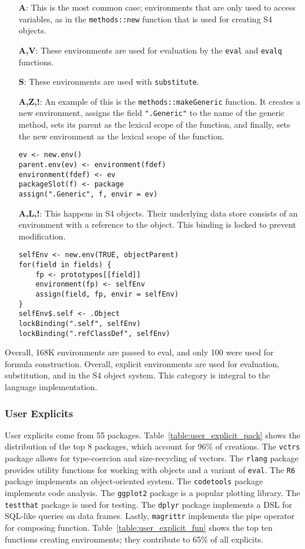 \documentclass[10pt,sigplan,authorversion=true]{acmart}
\renewcommand{\c}[1]{\lstinline |#1|\xspace}
\begin{document}
\begin{itemize}
\item[{\bf A}:] This is the most common case; environments that are only used to
  access variables, as in the \c{methods::new} function that is used for
  creating S4 objects.
\item[{\bf A,V}:] These environments are used for evaluation by the \c{eval} and
  \c{evalq} functions.
\item[{\bf S}:] These environments are used with \c{substitute}.
\item[{\bf A,Z,!}:] An example of this is the \c{methods::makeGeneric} function.
  It creates a new environment, assigns the field \c{".Generic"} to the name of
  the generic method, sets its parent as the lexical scope of the function, and
  finally, sets the new environment as the lexical scope of the function.
\begin{lstlisting}
ev <- new.env()
parent.env(ev) <- environment(fdef)
environment(fdef) <- ev
packageSlot(f) <- package
assign(".Generic", f, envir = ev)
\end{lstlisting}\medskip

\item[{\bf A,L,!}:] This happens in S4 objects. Their underlying data store
  consists of an environment with a reference to the object. This binding is
  locked to prevent modification.
\begin{lstlisting}
selfEnv <- new.env(TRUE, objectParent)
for(field in fields) {
    fp <- prototypes[[field]]
    environment(fp) <- selfEnv
    assign(field, fp, envir = selfEnv)
}
selfEnv$.self <- .Object
lockBinding(".self", selfEnv)
lockBinding(".refClassDef", selfEnv)
\end{lstlisting}

\end{itemize}

\noindent
Overall, 168K environments are passed to eval, and only 100 were used for
formula construction. Overall, explicit environments are used for evaluation,
substitution, and in the S4 object system. This category is integral to the
language implementation.

\subsubsection{User Explicits}

User explicits come from 55 packages. Table~\ref{table:user_explicit_pack} shows
the distribution of the top 8 packages, which account for 96\% of creations. The
\c{vctrs} package allows for type-coercion and size-recycling of vectors. The
\c{rlang} package provides utility functions for working with objects and a
variant of \c{eval}. The \c{R6} package implements an object-oriented system.
The \c{codetools} package implements code analysis. The \c{ggplot2} package is a
popular plotting library. The \c{testthat} package is used for testing. The
\c{dplyr} package implements a DSL for SQL-like queries on data frames. Lastly,
\c{magrittr} implements the pipe operator for composing function.
Table~\ref{table:user_explicit_fun} shows the top ten functions creating
environments; they contribute to 65\% of all explicits.
\end{document}
